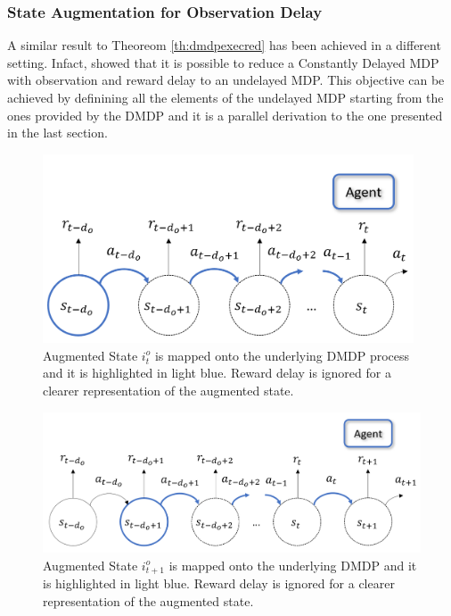             \subsubsection{State Augmentation for Observation Delay}
                A similar result to Theoreom \ref{th:dmdpexecred} has been achieved in a different setting. Infact,  showed that it is possible to reduce a Constantly Delayed MDP with observation and reward delay to an undelayed MDP. This objective can be achieved by definining all the elements of the undelayed MDP starting from the ones provided by the DMDP and it is a parallel derivation to the one presented in the last section. 
                
                \begin{figure}[!b]
                    \centering
                    \includegraphics[width=11cm, keepaspectratio]{images/dmdp/augmented_i_o.png}
                    \caption{Augmented State $i_t^o$ is mapped onto the underlying DMDP process and it is highlighted in light blue. Reward delay is ignored for a clearer representation of the augmented state.}
                    \label{fig:augmented_i_o}
                \end{figure}
                \begin{figure}[!b]
                    \centering
                    \includegraphics[width=13cm, keepaspectratio]{images/dmdp/augmented_i_o_next.png}
                    \caption{Augmented State $i_{t+1}^o$ is mapped onto the underlying DMDP and it is highlighted in light blue. Reward delay is ignored for a clearer representation of the augmented state.}
                    \label{fig:augmented_i_o_next}
                \end{figure}
                
